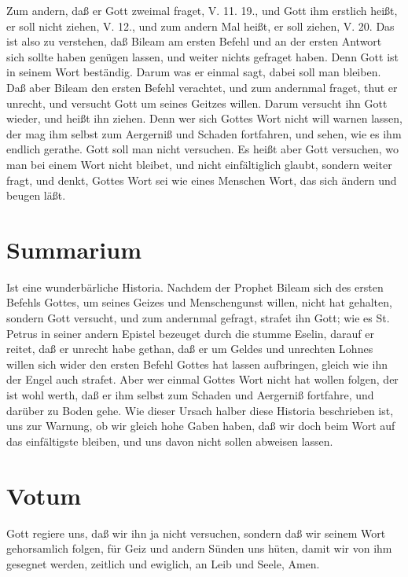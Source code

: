 Zum andern, daß er Gott zweimal fraget, V. 11. 19., und Gott ihm erstlich heißt, er soll nicht ziehen, V. 12., und zum andern Mal heißt, er soll ziehen, V. 20. Das ist also zu verstehen, daß Bileam am ersten Befehl und an der ersten Antwort sich sollte haben genügen lassen, und weiter nichts gefraget haben. Denn Gott ist in seinem Wort beständig. Darum was er einmal sagt, dabei soll man bleiben. Daß aber Bileam den ersten Befehl verachtet, und zum andernmal fraget, thut er unrecht, und versucht Gott um seines Geitzes willen. Darum versucht ihn Gott wieder, und heißt ihn ziehen. Denn wer sich Gottes Wort nicht will warnen lassen, der mag ihm selbst zum Aergerniß und Schaden fortfahren, und sehen, wie es ihm endlich gerathe. Gott soll man nicht versuchen. Es heißt aber Gott versuchen, wo man bei einem Wort nicht bleibet, und nicht einfältiglich glaubt, sondern weiter fragt, und denkt, Gottes Wort sei wie eines Menschen Wort, das sich ändern und beugen läßt.

\section{Summarium}

Ist eine wunderbärliche Historia. Nachdem der Prophet Bileam sich des ersten Befehls Gottes, um seines Geizes und Menschengunst willen, nicht hat gehalten, sondern Gott versucht, und zum andernmal gefragt, strafet ihn Gott; wie es St. Petrus in seiner andern Epistel bezeuget durch die stumme Eselin, darauf er reitet, daß er unrecht habe gethan, daß er um Geldes und unrechten Lohnes willen sich wider den ersten Befehl Gottes hat lassen aufbringen, gleich wie ihn der Engel auch strafet. Aber wer einmal Gottes Wort nicht hat wollen folgen, der ist wohl werth, daß er ihm selbst zum Schaden und Aergerniß fortfahre, und darüber zu Boden gehe. Wie dieser Ursach halber diese Historia beschrieben ist, uns zur Warnung, ob wir gleich hohe Gaben haben, daß wir doch beim Wort auf das einfältigste bleiben, und uns davon nicht sollen abweisen lassen.

\section{Votum}

Gott regiere uns, daß wir ihn ja nicht versuchen, sondern daß wir seinem Wort gehorsamlich folgen, für Geiz und andern Sünden uns hüten, damit wir von ihm gesegnet werden, zeitlich und ewiglich, an Leib und Seele, Amen.

